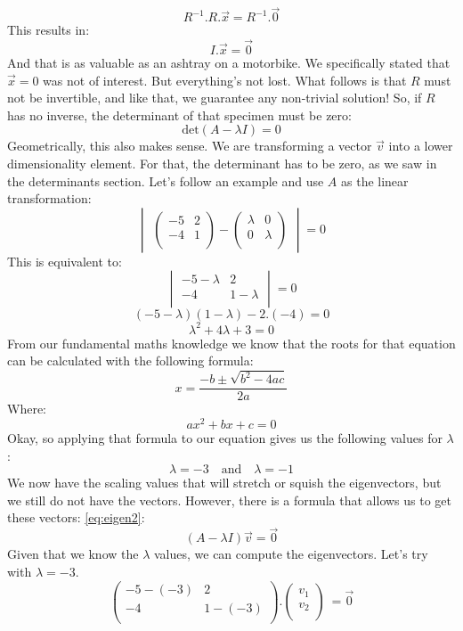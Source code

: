 \documentclass[a4,12pt,twosided,openany]{memoir}
\begin{document}
\[R^{-1}.R.\overrightarrow{x} = R^{-1}.\overrightarrow{0}\]
This results in:
\[I.\overrightarrow{x} = \overrightarrow{0}\]
And that is as valuable as an ashtray on a motorbike. We specifically stated that $\overrightarrow{x}=0$ was not of interest. But everything’s not lost. What follows is that $R$ must not be invertible, and like that, we guarantee any non-trivial solution! So, if $R$ has no inverse, the determinant of that specimen must be zero:
\[\textrm{det}(A - \lambda I) = 0 \]
Geometrically, this also makes sense. We are transforming a vector $\overrightarrow{v}$ into a lower dimensionality element. For that, the determinant has to be zero, as we saw in the determinants section. Let’s follow an example and use $A$ as the linear transformation:
\[\begin{vmatrix}\begin{pmatrix}
-5 & 2  \\
-4 & 1 \\
\end{pmatrix} - \begin{pmatrix}
\lambda & 0  \\
0 & \lambda  \\
\end{pmatrix} \end{vmatrix} = 0
\]
This is equivalent to:
\[\begin{vmatrix}
-5-\lambda & 2  \\
-4 & 1-\lambda \\
\end{vmatrix}  = 0 \]
\[(-5 -\lambda)(1-\lambda) -2.(-4) = 0 \]
\[\lambda^2 + 4\lambda + 3 = 0 \]
From our fundamental maths knowledge we know that the roots for that equation can be calculated with the following formula:
\[  x=\frac{-b \pm \sqrt{b^2-4ac}}{2a} \]
Where:
\[ax^2 + bx + c = 0 \]
Okay, so applying that formula to our equation gives us the following values for $\lambda$:
\[\lambda = -3 \quad \textrm{and} \quad \lambda = -1\]
We now have the scaling values that will stretch or squish the eigenvectors, but we still do not have the vectors. However, there is a formula that allows us to get these vectors: \ref{eq:eigen2}:
\[(A - \lambda I)\overrightarrow{v} = \overrightarrow{0} \]
Given that we know the $\lambda$ values, we can compute the eigenvectors. Let’s try with $\lambda = −3$.
\[\begin{pmatrix}
-5-(-3) & 2  \\
-4 & 1-(-3) \\
\end{pmatrix} .\begin{pmatrix}
 v_1\\
v_2\\
\end{pmatrix} \ = \overrightarrow{0} \]
\end{document}
